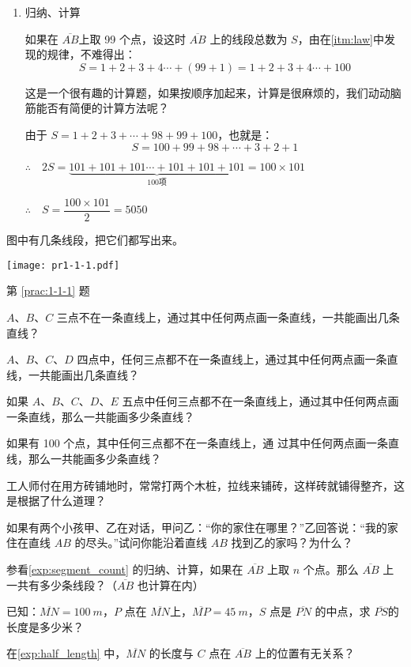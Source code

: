 \begin{solution}
\begin{enumerate}[leftmargin=2.0em,label=第\chinese*步,font=\bfseries]
	\item 归纳、计算

	如果在 $\overline{AB}$上取 99 个点，设这时 $\overline{AB}$ 上的线段总数为 $S$，由在\ref{itm:law}中发现的规律，不难得出：
	\[S=1+2+3+4\cdots +(99+1)=1+2+3+4\cdots +100\]

	这是一个很有趣的计算题，如果按顺序加起来，计算是很麻烦的，我们动动脑筋能否有简便的计算方法呢？

	由于 $S=1+2+3+\cdots +98+99+100$，也就是：
	\[S=100+99+98+\cdots +3+2+1\]

	$\therefore\quad 2S=\underbrace{101+101+101\cdots+101+101+101}_{100\text{项}}=100\times 101$

	$\therefore\quad S=\dfrac{100\times 101}{2}=5050$
\end{enumerate}
\end{solution}

\begin{Practice}
\begin{question}
	\item\label{prac:1-1-1} 图中有几条线段，把它们都写出来。
	\begin{figurehere}
		\begin{minipage}{\linewidth}\centering
			\texttt{[image: pr1-1-1.pdf]}
			\caption*{第 \ref{prac:1-1-1} 题}
		\end{minipage}
	\end{figurehere}
	\item $A$、$B$、$C$ 三点不在一条直线上，通过其中任何两点画一条直线，一共能画出几条直线？
	\item $A$、$B$、$C$、$D$ 四点中，任何三点都不在一条直线上，通过其中任何两点画一条直线，一共能画出几条直线？
	\item 如果 $A$、$B$、$C$、$D$、$E$ 五点中任何三点都不在一条直线上，通过其中任何两点画一条直线，那么一共能画多少条直线？
	\item 如果有 100 个点，其中任何三点都不在一条直线上，通	过其中任何两点画一条直线，那么一共能画多少条直线？
	\item 工人师付在用方砖铺地时，常常打两个木桩，拉线来铺砖，这样砖就铺得整齐，这是根据了什么道理？
	\item 如果有两个小孩甲、乙在对话，甲问乙：“你的家住在哪里？”乙回答说：“我的家住在直线 $AB$ 的尽头。”试问你能沿着直线 $AB$ 找到乙的家吗？为什么？
	\item 参看\cref{exp:segment_count} 的归纳、计算，如果在 $\overline{AB}$ 上取 $n$ 个点。那么 $\overline{AB}$ 上一共有多少条线段？（$\overline{AB}$ 也计算在内）
	\item 已知：$\overline{MN}=\qty{100}{m}$，$P$ 点在 $\overline{MN}$上，$\overline{MP}=\qty{45}{m}$，$S$ 点是 $\overline{PN}$ 的中点，求 $\overline{PS}$的长度是多少米？
	\item 在\cref{exp:half_length} 中，$\overline{MN}$ 的长度与 $C$ 点在 $\overline{AB}$ 上的位置有无关系？
\end{question}
\end{Practice}


